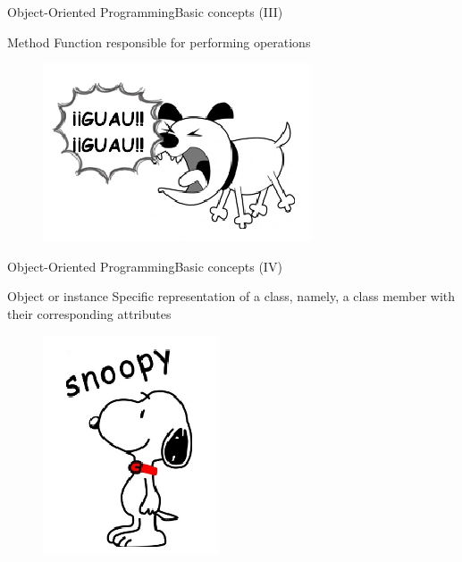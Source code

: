 \documentclass[10pt,compress]{beamer} %
\begin{document}
\begin{frame}{Object-Oriented Programming}{Basic concepts (III)}
	\vfill\begin{block}{Method}
		 Function responsible for performing operations
  	\end{block}	
		\begin{figure}
			\includegraphics[scale=0.5]{figs/metodo}
		\end{figure}				
\end{frame}

\begin{frame}{Object-Oriented Programming}{Basic concepts (IV)}
	\vfill\begin{block}{Object or instance}
		 Specific representation of a class, namely, a class member with their corresponding attributes
  	\end{block}	  	
		\begin{figure}
			\includegraphics[scale=0.5]{figs/instancia}
		\end{figure}				
\end{frame}
\end{document}
